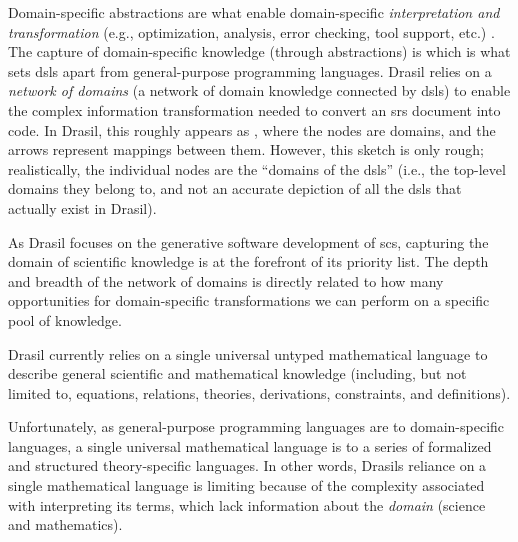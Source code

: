 Domain-specific abstractions are what enable domain-specific
\textit{interpretation and transformation} (e.g., optimization, analysis, error
checking, tool support, etc.) \cite{Czarnecki2005}. The capture of
domain-specific knowledge (through abstractions) is which is what sets
\acsp{dsl} apart from general-purpose programming languages. Drasil relies on a
\textit{network of domains} (a network of domain knowledge connected by
\aclp{dsl}) to enable the complex information transformation needed to convert
an \acs{srs} document into code. In Drasil, this roughly appears as
, where the nodes are domains, and the arrows
represent mappings between them. However, this sketch is only rough;
realistically, the individual nodes are the ``domains of the \aclp{dsl}'' (i.e.,
the top-level domains they belong to, and not an accurate depiction of all the
\aclp{dsl} that actually exist in Drasil).

\roughNetworkOfDomains{}

As Drasil focuses on the generative software development of \acs{scs}, capturing
the domain of scientific knowledge is at the forefront of its priority list. The
depth and breadth of the network of domains is directly related to how many
opportunities for domain-specific transformations we can perform on a specific
pool of knowledge.

Drasil currently relies on a single universal untyped mathematical language to
describe general scientific and mathematical knowledge (including, but not
limited to, equations, relations, theories, derivations, constraints, and
definitions).


Unfortunately, as general-purpose programming languages are to domain-specific
languages, a single universal mathematical language is to a series of formalized
and structured theory-specific languages. In other words, Drasils reliance on a
single mathematical language is limiting because of the complexity associated
with interpreting its terms, which lack information about the \textit{domain}
(science and mathematics).

